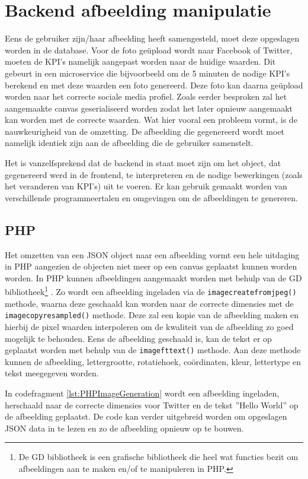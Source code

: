 \section{Backend afbeelding manipulatie}
Eens de gebruiker zijn/haar afbeelding heeft samengesteld, moet deze opgeslagen worden in de database. Voor de foto ge\"{u}pload wordt naar Facebook of Twitter, moeten de KPI's namelijk aangepast worden naar de huidige waarden. Dit gebeurt in een microservice die bijvoorbeeld om de 5 minuten de nodige KPI's berekend en met deze waarden een foto genereerd. Deze foto kan daarna ge\"{u}pload worden naar het correcte sociale media profiel. Zoals eerder besproken zal het aangemaakte canvas geserialiseerd worden zodat het later opnieuw aangemaakt kan worden met de correcte waarden. Wat hier vooral een probleem vormt, is de nauwkeurigheid van de omzetting. De afbeelding die gegenereerd wordt moet namelijk identiek zijn aan de afbeelding die de gebruiker samenstelt. 

Het is vanzelfsprekend dat de backend in staat moet zijn om het object, dat gegenereerd werd in de frontend, te interpreteren en de nodige bewerkingen (zoals het veranderen van KPI's) uit te voeren. Er kan gebruik gemaakt worden van verschillende programmeertalen en omgevingen om de afbeeldingen te genereren. 

\subsection{PHP}
Het omzetten van een JSON object naar een afbeelding vormt een hele uitdaging in PHP aangezien de objecten niet meer op een canvas geplaatst kunnen worden worden. In PHP kunnen afbeeldingen aangemaakt worden met behulp van de GD bibliotheek\footnote{De GD bibliotheek is een grafische bibliotheek die heel wat functies bezit om afbeeldingen aan te maken en/of te manipuleren in PHP.} \cite{GDlibrary}. Zo wordt een afbeelding ingeladen via de \texttt{imagecreatefromjpeg()} methode, waarna deze geschaald kan worden naar de correcte dimensies met de \texttt{imagecopyresampled()} methode. Deze zal een kopie van de afbeelding maken en hierbij de pixel waarden interpoleren om de kwaliteit van de afbeelding zo goed mogelijk te behouden. Eens de afbeelding geschaald is, kan de tekst er op geplaatst worden met behulp van de \texttt{imagefttext()} methode. Aan deze methode kunnen de afbeelding, lettergrootte, rotatiehoek, co\"{o}rdinaten, kleur, lettertype en tekst meegegeven worden. 

In codefragment \ref{lst:PHPImageGeneration} wordt een afbeelding ingeladen, herschaald naar de correcte dimensies voor Twitter en de tekst ''Hello World'' op de afbeelding geplaatst. De code kan verder uitgebreid worden om opgeslagen JSON data in te lezen en zo de afbeelding opnieuw op te bouwen. 

